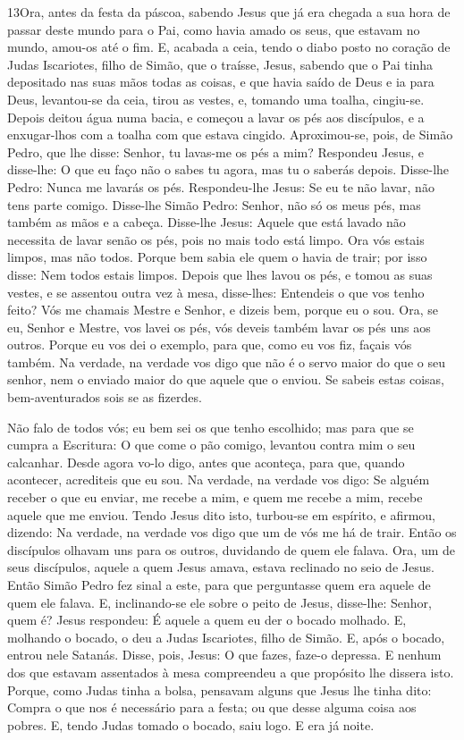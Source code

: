 \medskip

\lettrine{13} Ora, antes da festa da páscoa, sabendo Jesus que
já era chegada a sua hora de passar deste mundo para o Pai, como
havia amado os seus, que estavam no mundo, amou-os até o fim. E,
acabada a ceia, tendo o diabo posto no coração de Judas Iscariotes,
filho de Simão, que o traísse, Jesus, sabendo que o Pai tinha
depositado nas suas mãos todas as coisas, e que havia saído de Deus
e ia para Deus, levantou-se da ceia, tirou as vestes, e, tomando
uma toalha, cingiu-se. Depois deitou água numa bacia, e começou
a lavar os pés aos discípulos, e a enxugar-lhos com a toalha com que
estava cingido. Aproximou-se, pois, de Simão Pedro, que lhe
disse: Senhor, tu lavas-me os pés a mim? Respondeu Jesus, e
disse-lhe: O que eu faço não o sabes tu agora, mas tu o saberás
depois. Disse-lhe Pedro: Nunca me lavarás os pés. Respondeu-lhe
Jesus: Se eu te não lavar, não tens parte comigo. Disse-lhe
Simão Pedro: Senhor, não só os meus pés, mas também as mãos e a
cabeça. Disse-lhe Jesus: Aquele que está lavado não necessita
de lavar senão os pés, pois no mais todo está limpo. Ora vós estais
limpos, mas não todos. Porque bem sabia ele quem o havia de
trair; por isso disse: Nem todos estais limpos. Depois que
lhes lavou os pés, e tomou as suas vestes, e se assentou outra vez à
mesa, disse-lhes: Entendeis o que vos tenho feito? Vós me
chamais Mestre e Senhor, e dizeis bem, porque eu o sou. Ora,
se eu, Senhor e Mestre, vos lavei os pés, vós deveis também lavar os
pés uns aos outros. Porque eu vos dei o exemplo, para que,
como eu vos fiz, façais vós também. Na verdade, na verdade
vos digo que não é o servo maior do que o seu senhor, nem o enviado
maior do que aquele que o enviou. Se sabeis estas coisas,
bem-aventurados sois se as fizerdes.

Não falo de todos vós; eu bem sei os que tenho escolhido; mas
para que se cumpra a Escritura: O que come o pão comigo, levantou
contra mim o seu calcanhar. Desde agora vo-lo digo, antes que
aconteça, para que, quando acontecer, acrediteis que eu sou.
Na verdade, na verdade vos digo: Se alguém receber o que eu
enviar, me recebe a mim, e quem me recebe a mim, recebe aquele que
me enviou. Tendo Jesus dito isto, turbou-se em espírito, e
afirmou, dizendo: Na verdade, na verdade vos digo que um de vós me
há de trair. Então os discípulos olhavam uns para os outros,
duvidando de quem ele falava. Ora, um de seus discípulos,
aquele a quem Jesus amava, estava reclinado no seio de Jesus.
Então Simão Pedro fez sinal a este, para que perguntasse quem
era aquele de quem ele falava. E, inclinando-se ele sobre o
peito de Jesus, disse-lhe: Senhor, quem é? Jesus respondeu: É
aquele a quem eu der o bocado molhado. E, molhando o bocado, o deu a
Judas Iscariotes, filho de Simão. E, após o bocado, entrou
nele Satanás. Disse, pois, Jesus: O que fazes, faze-o depressa.
E nenhum dos que estavam assentados à mesa compreendeu a que
propósito lhe dissera isto. Porque, como Judas tinha a bolsa,
pensavam alguns que Jesus lhe tinha dito: Compra o que nos é
necessário para a festa; ou que desse alguma coisa aos pobres.
E, tendo Judas tomado o bocado, saiu logo. E era já noite.

